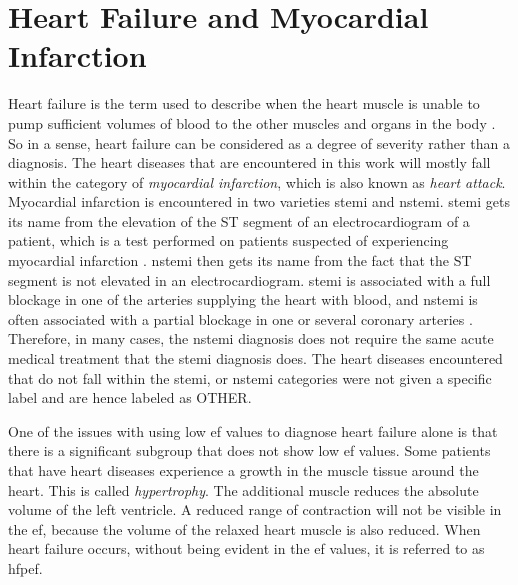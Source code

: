 \section{Heart Failure and Myocardial Infarction} \label{sec:heart_diseases}

Heart failure is the term used to describe when the heart muscle is unable to pump sufficient volumes of blood to the other muscles and organs in the body \cite{medicine_net}. So in a sense, heart failure can be considered as a degree of severity rather than a diagnosis. The heart diseases that are encountered in this work will mostly fall within the category of \textit{myocardial infarction}, which is also known as \textit{heart attack}. Myocardial infarction is encountered in two varieties \acrfull{stemi} and \acrfull{nstemi}. \acrshort{stemi} gets its name from the elevation of the ST segment of an electrocardiogram of a patient, which is a test performed on patients suspected of experiencing myocardial infarction \cite{ecg_stemi}. \acrshort{nstemi} then gets its name from the fact that the ST segment is not elevated in an electrocardiogram. \acrshort{stemi} is associated with a full blockage in one of the arteries supplying the heart with blood, and \acrshort{nstemi} is often associated with a partial blockage in one or several coronary arteries \cite{ambulanseforum}. Therefore, in many cases, the \acrshort{nstemi} diagnosis does not require the same acute medical treatment that the \acrshort{stemi} diagnosis does. The heart diseases encountered that do not fall within the \acrshort{stemi}, or \acrshort{nstemi} categories were not given a specific label and are hence labeled as OTHER. \bigskip

One of the issues with using low \acrshort{ef} values to diagnose heart failure alone is that there is a significant subgroup that does not show low \acrshort{ef} values. Some patients that have heart diseases experience a growth in the muscle tissue around the heart. This is called \textit{hypertrophy}. The additional muscle reduces the absolute volume of the left ventricle. A reduced range of contraction will not be visible in the \acrshort{ef}, because the volume of the relaxed heart muscle is also reduced. When heart failure occurs, without being evident in the \acrshort{ef} values, it is referred to as \acrshort{hfpef}. \bigskip

